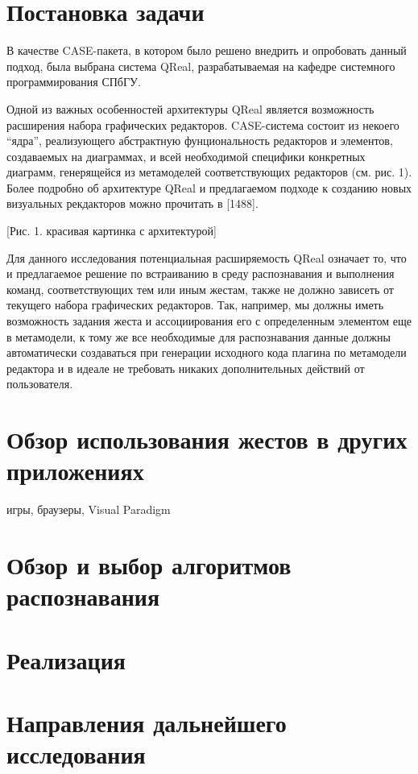 \documentclass[a5paper]{article}
\begin{document}
\section{Постановка задачи}
В качестве CASE-пакета, в котором было решено внедрить и опробовать данный подход, была выбрана система QReal, разрабатываемая на кафедре 
системного программирования СПбГУ. 

Одной из важных особенностей архитектуры QReal является возможность расширения набора графических редакторов. CASE-система состоит из 
некоего ``ядра'', реализующего абстрактную фунциональность редакторов и элементов, создаваемых на диаграммах, и всей необходимой специфики 
конкретных диаграмм, генерящейся из метамоделей соответствующих редакторов (см. рис. 1). Более подробно об архитектуре QReal и предлагаемом 
подходе к  созданию новых визуальных рекдакторов можно прочитать в [1488]. 

[Рис. 1. красивая картинка с архитектурой]

Для данного исследования потенциальная расширяемость QReal означает то, что и предлагаемое решение по встраиванию в среду распознавания
и выполнения команд, соответствующих тем или иным жестам, также не должно зависеть от текущего набора графических редакторов. Так, например,
мы должны иметь возможность задания жеста и ассоциирования его с определенным элементом еще в метамодели, к тому же все необходимые 
для распознавания данные должны автоматически создаваться при генерации исходного кода плагина по метамодели редактора и в идеале не требовать 
никаких дополнительных действий от пользователя. 

\section{Обзор использования жестов в других приложениях}

игры, браузеры, Visual Paradigm

\section{Обзор и выбор алгоритмов распознавания}

\section{Реализация}

\section{Направления дальнейшего исследования}
\end{document}
